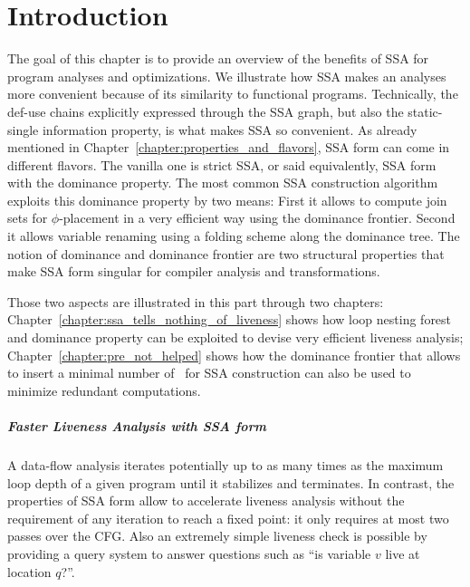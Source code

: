 \chapter{Introduction }
\label{chapter:analysis}

The goal of this chapter is to provide an overview of the benefits of
SSA for program analyses and optimizations. We illustrate how SSA
makes an analyses more convenient because of its similarity to
functional programs. Technically, the def-use chains explicitly
expressed through the SSA graph, but also the static-single
information property, is what makes SSA so convenient.
As already mentioned in Chapter~\ref{chapter:properties_and_flavors},
SSA form can come in different flavors. The vanilla one is strict SSA, or said
equivalently, SSA form with the dominance property. The most common SSA
construction algorithm exploits this dominance property by two means:
First it allows to compute join sets for $\phi$-placement in a very
efficient way using the dominance frontier.  Second it allows variable
renaming using a folding scheme along the dominance tree.  The notion
of dominance and dominance frontier are two structural properties that
make SSA form singular for compiler analysis and transformations.

Those two aspects are illustrated in this part through two chapters:
Chapter~\ref{chapter:ssa_tells_nothing_of_liveness} shows how loop
nesting forest and dominance property can be exploited to devise very
efficient liveness analysis; Chapter~\ref{chapter:pre_not_helped}
shows how the dominance frontier that allows to insert a minimal number of
\phifun\ for SSA construction can also be used to minimize redundant
computations.

\paragraph{Faster Liveness Analysis with SSA form}
A data-flow analysis iterates potentially up to as many times as the
maximum loop depth of a given program until it stabilizes and
terminates. In contrast, the properties of SSA form allow to
accelerate liveness analysis without the requirement of any iteration
to reach a fixed point: it only requires at most two passes over the
CFG. Also an extremely simple liveness check is possible by providing
a query system to answer questions such as ``is variable $v$ live at
location $q$?''.

